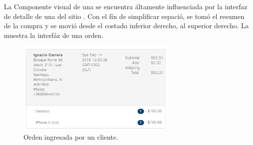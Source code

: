 	La Componente visual de una \orderEF se encuentra áltamente influenciada por la interfaz de detalle de una \orderEF del sitio \dealextremeNAME. Con el fín de simplificar espació, se tomó el resumen de la compra y se movió desde el costado inferior derecho, al superior derecho. La  muestra la interfáz de una orden.

	\begin{figure}[h!]
		\centering
		\includegraphics[width=0.7\textwidth]{figuras/orders/grid/order.png}
		\caption{Orden ingresada por un cliente.}
		\label{figure:dashboard:orders:single_order}
	\end{figure}

